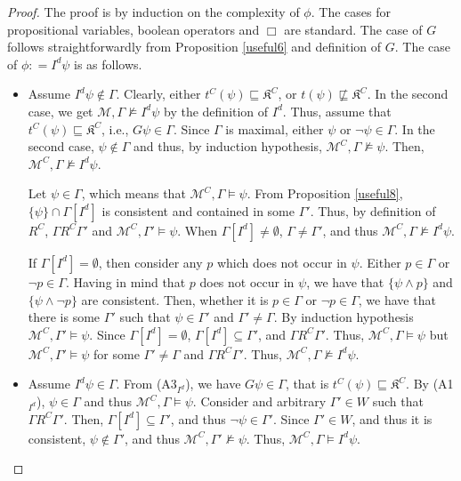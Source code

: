 \documentclass{article}
\begin{document}
\begin{proof}

The proof is by induction on the complexity of $\phi$. The cases for propositional variables, boolean operators and $\Box$ are standard. The case of $G$ follows straightforwardly from Proposition \ref{useful6} and definition of $G$. The case of $\phi : = I^{d} \psi$ is as follows.

\begin{itemize}

\item[($\Rightarrow$)] Assume $I^{d} \psi \not \in \Gamma$. Clearly, either $t^{C}(\psi) \sqsubseteq \mathfrak{K}^{C}$, or $t(\psi) \not \sqsubseteq \mathfrak{K}^{C}$. In the second case, we get $\mathcal{M}, \Gamma \not \models I^{d} \psi$ by the definition of $I^{d}$. Thus, assume that $t^{C}(\psi) \sqsubseteq \mathfrak{K}^{C}$, i.e., $G \psi \in \Gamma$. Since $\Gamma$ is maximal, either $\psi$ or $\neg \psi \in \Gamma$. In the second case, $\psi \not \in \Gamma$ and thus, by induction hypothesis, $\mathcal{M}^{C}, \Gamma \not \models \psi$. Then, $\mathcal{M}^{C}, \Gamma \not \models I^{d} \psi$.

Let $\psi \in \Gamma$, which means that $\mathcal{M}^{C}, \Gamma \models \psi$. From Proposition \ref{useful8}, $\{\psi\} \cap \Gamma[I^{d}]$ is consistent and contained in some $\Gamma'$. Thus, by definition of $R^{C}$, $\Gamma R^{C} \Gamma'$ and $\mathcal{M}^{C}, \Gamma' \models \psi$. When $\Gamma[I^{d}] \not = \emptyset$, $\Gamma \not = \Gamma'$, and thus $\mathcal{M}^{C}, \Gamma \not \models I^{d} \psi$.

If $\Gamma[I^{d}] = \emptyset$, then consider any $p$ which does not occur in $\psi$. Either $p \in \Gamma$ or $\neg p \in \Gamma$. Having in mind that $p$ does not occur in $\psi$, we have that $\{\psi \wedge p\}$ and $\{\psi \wedge \neg p\}$ are consistent. Then, whether it is $p \in \Gamma$ or $\neg p \in \Gamma$, we have that there is some $\Gamma'$ such that $\psi \in \Gamma'$ and $\Gamma' \not = \Gamma$. By induction hypothesis $\mathcal{M}^{C}, \Gamma' \models \psi$. Since $\Gamma[I^{d}] = \emptyset$, $\Gamma[I^{d}] \subseteq \Gamma'$, and $\Gamma R^{C} \Gamma'$. Thus, $\mathcal{M}^{C}, \Gamma \models \psi$ but $\mathcal{M}^{C}, \Gamma' \models \psi$ for some $\Gamma' \not = \Gamma$ and $\Gamma R^{C} \Gamma'$. Thus, $\mathcal{M}^{C}, \Gamma \not \models I^{d} \psi$.

\item[($\Leftarrow$)] Assume $I^{d} \psi \in \Gamma$. From (A3$_{I^{d}}$), we have $G \psi \in \Gamma$, that is $t^{C}(\psi) \sqsubseteq \mathfrak{K}^{C}$. By (A1$_{I^{d}}$), $\psi \in \Gamma$ and thus $\mathcal{M}^{C}, \Gamma \models \psi$. Consider and arbitrary $\Gamma' \in W$ such that $\Gamma R^{C} \Gamma'$. Then, $\Gamma[I^{d}] \subseteq \Gamma'$, and thus $\neg \psi \in \Gamma'$. Since $\Gamma' \in W$, and thus it is consistent, $\psi \not \in \Gamma'$, and thus $\mathcal{M}^{C}, \Gamma' \not \models \psi$. Thus, $\mathcal{M}^{C}, \Gamma \models I^{d} \psi$.

\end{itemize}

\end{proof}
\end{document}
